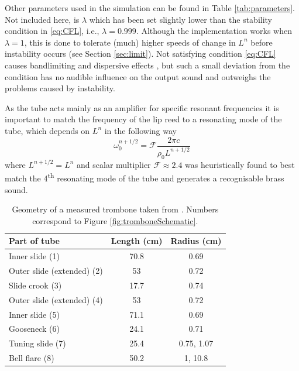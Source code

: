 Other parameters used in the simulation can be found in Table \ref{tab:parameters}. Not included here, is $\lambda$ which has been set slightly lower than the stability condition in \eqref{eq:CFL}, i.e., $\lambda = 0.999$. Although the implementation works when $\lambda = 1$, this is done to tolerate (much) higher speeds of change in $L^n$ before instability occurs (see Section \ref{sec:limit}). Not satisfying condition \eqref{eq:CFL} causes bandlimiting and dispersive effects \cite{bilbao2009}, but such a small deviation from the condition has no audible influence on the output sound and outweighs the problems caused by instability.

As the tube acts mainly as an amplifier for specific resonant frequencies it is important to match the frequency of the lip reed to a resonating mode of the tube, which depends on $L^n$ in the following way
\begin{equation}
    \omega_0^{n+1/2} = \mathcal{F}\frac{2\pi c}{\rho_0 L^{n+1/2}}
\end{equation}
where $L^{n+1/2} = L^n$ and scalar multiplier $\mathcal{F} \approx 2.4$  was heuristically found to best match the 4\textsuperscript{th} resonating mode of the tube and generates a recognisable brass sound.
\begin{table}[t]
    \small
    \begin{center}
    \begin{tabular}{|l|c|c|}
        \hline
        Part of tube & Length (cm) & Radius (cm)\\\hline
        Inner slide (1) & 70.8 & 0.69\\
        Outer slide (extended) (2) & 53 & 0.72 
        \\
        Slide crook (3)& 17.7 & 0.74\\
        Outer slide (extended) (4) & 53 & 0.72 
        \\
        Inner slide (5) & 71.1 & 0.69\\
        Gooseneck (6) & 24.1 & 0.71\\
        Tuning slide (7) & 25.4 & 0.75, 1.07\\
        Bell flare (8) & 50.2& 1, 10.8\\\hline
    \end{tabular}
    \caption{Geometry of a measured trombone taken from \cite{Smyth2011}. Numbers correspond to Figure \ref{fig:tromboneSchematic}.\label{tab:geometry}}
    \end{center}
\end{table}

